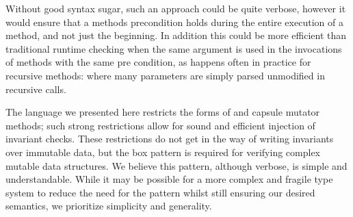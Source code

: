 Without good syntax sugar, such an approach could be quite verbose, however it would ensure that a methods precondition holds during the entire execution of a method, and not just the beginning. In addition this could be more efficient than traditional runtime checking when the same argument is used in the invocations of methods with the same pre condition, as happens often in practice for recursive methods: where many parameters are simply parsed unmodified in recursive calls.









The language we presented here restricts the forms of \Q@invariant@ and capsule mutator methods;
such strong restrictions allow for sound and efficient injection of invariant checks. 
These restrictions do not get in the way of writing invariants over immutable data, but the box pattern is required for verifying complex mutable data structures. We believe this pattern, although verbose, is simple and understandable. While it may be possible for a more complex and fragile type system to reduce the need for the pattern whilst still ensuring our desired semantics, we prioritize simplicity and generality. 


